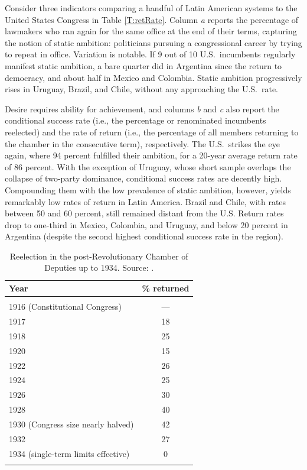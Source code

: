 \documentclass[letter,12pt]{article}
\begin{document}
Consider three indicators comparing a handful of Latin American systems to the United States Congress in Table \ref{T:retRate}. Column \emph{a} reports the percentage of lawmakers who ran again for the same office at the end of their terms, capturing the notion of static ambition: politicians pursuing a congressional career by trying to repeat in office. Variation is notable. If 9 out of 10 U.S.\ incumbents regularly manifest static ambition, a bare quarter did in Argentina since the return to democracy, and about half in Mexico and Colombia. Static ambition progressively rises in Uruguay, Brazil, and Chile, without any approaching the U.S.\ rate. 

Desire requires ability for achievement, and columns \emph{b} and \emph{c} also report the conditional success rate (i.e., the percentage or renominated incumbents reelected) and the rate of return (i.e., the percentage of all members returning to the chamber in the consecutive term), respectively. The U.S.\ strikes the eye again, where 94 percent fulfilled their ambition, for a 20-year average return rate of 86 percent. With the exception of Uruguay, whose short sample overlaps the collapse of two-party dominance, conditional success rates are decently high. Compounding them with the low prevalence of static ambition, however, yields remarkably low rates of return in Latin America. Brazil and Chile, with rates between 50 and 60 percent, still remained distant from the U.S. Return rates drop to one-third in Mexico, Colombia, and Uruguay, and below 20 percent in Argentina (despite the second highest conditional success rate in the region). 

\begin{table}
  \centering
  \begin{tabular}{lc}
    Year &  \% returned  \\ \hline \\ [-1.25ex]
    1916 (Constitutional Congress) &          --- \\
    1917 &           18 \\
    1918 &           25 \\
    1920 &           15 \\
    1922 &           26 \\
    1924 &           25 \\
    1926 &           30 \\
    1928 &           40 \\
    1930 (Congress size nearly halved) &           42 \\
    1932 &           27 \\
    1934 (single-term limits effective) &            0 \\ [-1.25ex] \\ \hline
  \end{tabular}
  \caption{Reelection in the post-Revolutionary Chamber of Deputies up to 1934. Source: \citet{godoy.reeleccion.2014}.}\label{T:1920s}
\end{table}
\end{document}

